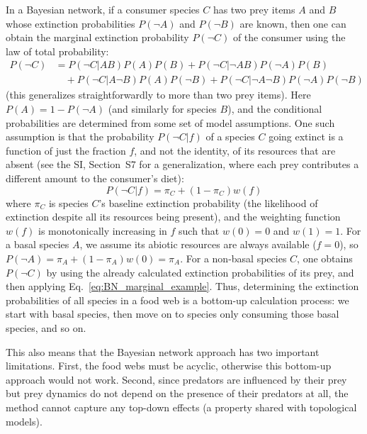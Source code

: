\documentclass[11pt]{article}
\newcommand{\SI}{SI}
\begin{document}
\begin{mdframed}
In a Bayesian network, if a consumer species $C$ has two prey items $A$ and $B$ whose extinction probabilities $P(\neg A)$ and $P(\neg B)$ are known, then one can obtain the marginal extinction probability $P(\neg C)$ of the consumer using the law of total probability:
\begin{equation}
  \label{eq:BN_marginal_example}
  \tag{B1}
  \begin{split}
    P(\neg C) &= P(\neg C|A B)P(A)P(B) + P(\neg C|\neg A B)P(\neg A)P(B)
    \\ &\quad + P(\neg C|A \neg B)P(A)P(\neg B) + P(\neg C|\neg A \neg B)
    P(\neg A)P(\neg B)
  \end{split}
\end{equation}
(this generalizes straightforwardly to more than two prey items). Here $P(A) = 1 - P(\neg A)$ (and similarly for species $B$), and the conditional probabilities are determined from some set of model assumptions. One such assumption is that the probability $P(\neg C|f)$ of a species $C$ going extinct is a function of just the fraction $f$, and not the identity, of its resources that are absent (see the \SI, Section~S7 for a generalization, where each prey contributes a different amount to the consumer's diet):
\begin{equation}
  \label{eq:BN_prob}
  \tag{B2}
  P(\neg C|f) = \pi_C + (1 - \pi_C) w(f)
\end{equation}
where $\pi_C$ is species $C$'s baseline extinction probability (the likelihood of extinction despite all its resources being present), and the weighting function $w(f)$ is monotonically increasing in $f$ such that $w(0)=0$ and $w(1)=1$. For a basal species $A$, we assume its abiotic resources are always available ($f=0$), so $P(\neg A) = \pi_A + (1 - \pi_A) w(0) = \pi_A$. For a non-basal species $C$, one obtains $P(\neg C)$ by using the already calculated extinction probabilities of its prey, and then applying Eq.~\ref{eq:BN_marginal_example}. Thus, determining the extinction probabilities of all species in a food web is a bottom-up calculation process: we start with basal species, then move on to species only consuming those basal species, and so on.

This also means that the Bayesian network approach has two important limitations. First, the food webs must be acyclic, otherwise this bottom-up approach would not work. Second, since predators are influenced by their prey but prey dynamics do not depend on the presence of their predators at all, the method cannot capture any top-down effects (a property shared with topological models).

\end{mdframed}
\end{document}
